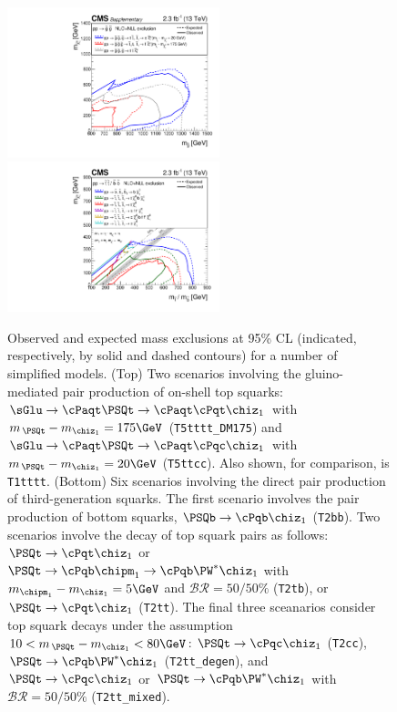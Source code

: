 \begin{figure}[h!]
  \begin{center}
    \includegraphics[width=0.55\textwidth]{figures/limits/v2/naturalWT1SUMMARY.pdf}
    \includegraphics[width=0.55\textwidth]{figures/limits/v2/allThirdGenSUMMARY.pdf} 
    \caption{ Observed and expected mass exclusions at 95\% CL
      (indicated, respectively, by solid and dashed contours) for a
      number of simplified models. (Top) Two scenarios involving the
      gluino-mediated pair production of on-shell top squarks:
      $\sGlu\ra\cPaqt\PSQt\ra\cPaqt\cPqt\chiz_1$ with $m_{\,\PSQt} -
      m_{\chiz_1} = 175\GeV$ (\texttt{T5tttt\_DM175}) and
      $\sGlu\ra\cPaqt\PSQt\ra\cPaqt\cPqc\chiz_1$ with $m_{\,\PSQt} -
      m_{\chiz_1} = 20\GeV$ (\texttt{T5ttcc}). Also shown, for
      comparison, is \texttt{T1tttt}. (Bottom) Six scenarios involving
      the direct pair production of third-generation squarks. The
      first scenario involves the pair production of bottom squarks,
      $\PSQb\ra\cPqb\chiz_1$ (\texttt{T2bb}). Two scenarios involve
      the decay of top squark pairs as follows: $\PSQt\ra\cPqt\chiz_1$
      or $\PSQt\ra\cPqb\chipm_1\ra\cPqb\PW^*\chiz_1$ with
      $m_{\chipm_1} - m_{\chiz_1} = 5\GeV$ and $\mathcal{BR} =
      50/50\%$ (\texttt{T2tb}), or $\PSQt\ra\cPqt\chiz_1$
      (\texttt{T2tt}). The final three sceanarios consider top squark
      decays under the assumption $10 < m_{\,\PSQt} - m_{\chiz_1} <
      80\GeV$: $\PSQt\ra\cPqc\chiz_1$ (\texttt{T2cc}),
      $\PSQt\ra\cPqb\PW^*\chiz_1$ (\texttt{T2tt\_degen}), and
      $\PSQt\ra\cPqc\chiz_1$ or $\PSQt\ra\cPqb\PW^*\chiz_1$ with
      $\mathcal{BR} = 50/50\%$ (\texttt{T2tt\_mixed}).  }
    \label{fig:limits-sms-2} 
  \end{center} 
\end{figure}

